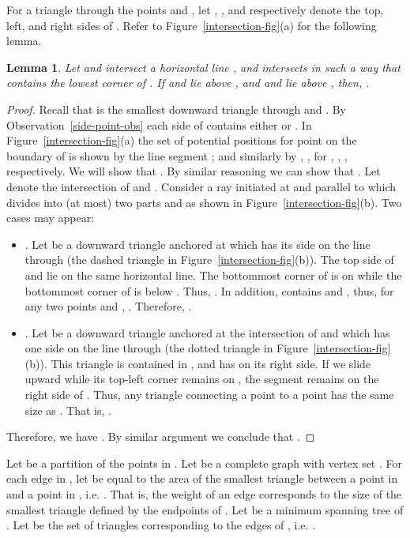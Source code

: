 \documentclass[11pt,a4paper]{article}
\newtheorem{lemma}{Lemma}
\begin{document}
For a triangle  through the points  and , let , , and  respectively denote the top, left, and right sides of . Refer to Figure~\ref{intersection-fig}(a) for the following lemma.
\begin{lemma}
\label{triangle3}
 Let  and  intersect a horizontal line , and  intersects  in such a way that  contains the lowest corner of . If  and  lie above , and  and  lie above , then, .
\end{lemma}
\begin{proof}
Recall that  is the smallest downward triangle through  and . By Observation~\ref{side-point-obs} each side of  contains either  or . 
In Figure~\ref{intersection-fig}(a) the set of potential positions for point  on the boundary of  is shown by the line segment ; and similarly by , ,  for , , , respectively. We will show that . By similar reasoning we can show that . Let  denote the intersection of  and . Consider a ray  initiated at  and parallel to  which divides  into (at most) two parts  and  as shown in Figure~\ref{intersection-fig}(b). Two cases may appear:

\begin{itemize}
 \item . Let  be a downward triangle anchored at  which has its  side on the line through  (the dashed triangle in Figure~\ref{intersection-fig}(b)). The top side of  and  lie on the same horizontal line. The bottommost corner of  is on  while the bottommost corner of  is below . Thus, . In addition,  contains  and , thus, for any two points  and , . Therefore, .
 \item . Let  be a downward triangle anchored at the intersection of  and  which has one side on the line through  (the dotted triangle in Figure~\ref{intersection-fig}(b)). This triangle is contained in , and has  on its right side. If we slide  upward while its top-left corner remains on , the segment  remains on the right side of . Thus, any triangle connecting a point  to a point  has the same size as . That is, . 
\end{itemize}

Therefore, we have . By similar argument we conclude that .  
\end{proof}
Let  be a partition of the points in .
Let  be a complete graph with vertex set . For each edge  in , let  be equal to the area of the smallest triangle between a point in  and a point in , i.e. . That is, the weight of an edge  corresponds to the size of the smallest triangle  defined by the endpoints of . Let  be a minimum spanning tree of . Let  be the set of triangles corresponding to the edges of , i.e. . 
\end{document}
